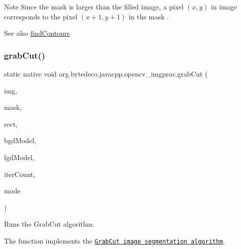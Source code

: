 \begin{DoxyNote}{Note}
Since the mask is larger than the filled image, a pixel $(x, y)$ in image corresponds to the pixel $(x+1, y+1)$ in the mask . 
\end{DoxyNote}
\begin{DoxySeeAlso}{See also}
\hyperlink{group__imgproc__shape_gad95c6aa001eb4a24cc898ff08dcb81da}{find\+Contours} 
\end{DoxySeeAlso}
\mbox{\label{group__imgproc__misc_gaa33f53e9a934a40de2e80d2cec508ba2}} 
\subsubsection{\texorpdfstring{grab\+Cut()}{grabCut()}}
{\footnotesize\ttfamily static native void org.\+bytedeco.\+javacpp.\+opencv\+\_\+imgproc.\+grab\+Cut (\begin{DoxyParamCaption}\item[{@By\+Val Mat}]{img,  }\item[{@By\+Val Mat}]{mask,  }\item[{@By\+Val Rect}]{rect,  }\item[{@By\+Val Mat}]{bgd\+Model,  }\item[{@By\+Val Mat}]{fgd\+Model,  }\item[{int}]{iter\+Count,  }\item[{int}]{mode }\end{DoxyParamCaption})\hspace{0.3cm}{\ttfamily [static]}}



Runs the Grab\+Cut algorithm. 

The function implements the \href{http://en.wikipedia.org/wiki/GrabCut}{\tt Grab\+Cut image segmentation algorithm}. 


